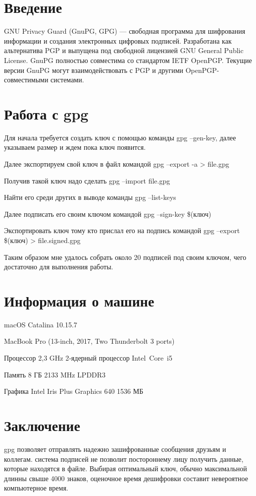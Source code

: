 \section{Введение}

GNU Privacy Guard (GnuPG, GPG) — свободная программа для шифрования информации и создания электронных цифровых подписей. Разработана как альтернатива PGP и выпущена под свободной лицензией GNU General Public License. GnuPG полностью совместима со стандартом IETF OpenPGP. Текущие версии GnuPG могут взаимодействовать с PGP и другими OpenPGP-совместимыми системами.


\section{Работа с gpg}

Для начала требуется создать ключ с помощью команды gpg --gen-key, далее указываем размер и ждем пока ключ появится.

Далее экспортируем свой ключ в файл командой gpg --export -a > file.gpg

Получив такой ключ надо сделать gpg --import file.gpg

Найти его среди других в выводе команды gpg --list-keys

Далее подписать его своим ключом командой gpg --sign-key \$(ключ)

Экспортировать ключ тому кто прислал его на подпись командой gpg --export \$(ключ) > file.signed.gpg

Таким образом мне удалось собрать около 20 подписей под своим ключом, чего достаточно для выполнения работы.

\section{Информация о машине}

macOS Catalina 10.15.7

MacBook Pro (13-inch, 2017, Two Thunderbolt 3 ports)

Процессор 2,3 GHz 2‑ядерный процессор Intel Core i5

Память 8 ГБ 2133 MHz LPDDR3

Графика Intel Iris Plus Graphics 640 1536 МБ

\section{Заключение}

gpg позволяет отправлять надежно зашифрованные сообщения друзьям и коллегам. система подписей не позволит постороннему лицу получить данные, которые находятся в файле. Выбирая оптимальный ключ, обычно максимальной длинны свыше 4000 знаков, оценочное время дешифровки составит невероятное компьютерное время.









